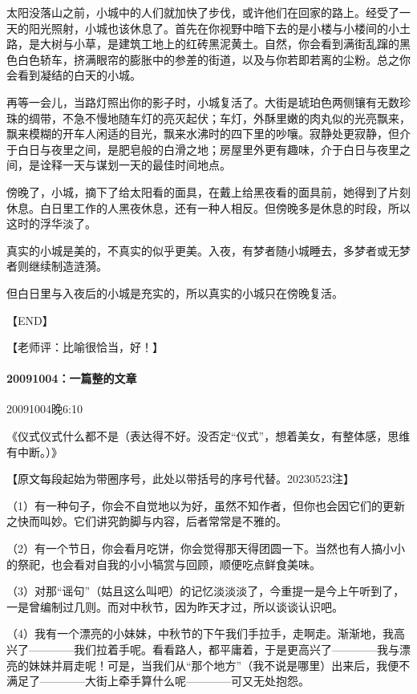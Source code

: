 \documentclass[UTF8]{Diaries}
\begin{document}
太阳没落山之前，小城中的人们就加快了步伐，或许他们在回家的路上。经受了一天的阳光照射，小城也该休息了。首先在你视野中暗下去的是小楼与小楼间的小土路，是大树与小草，是建筑工地上的红砖黑泥黄土。自然，你会看到满街乱蹿的黑色白色轿车，挤满眼帘的膨胀中的参差的街道，以及与你若即若离的尘粉。总之你会看到凝结的白天的小城。

再等一会儿，当路灯照出你的影子时，小城复活了。大街是琥珀色两侧镶有无数珍珠的绸带，不急不慢地随车灯的亮灭起伏；车灯，外酥里嫩的肉丸似的光亮飘来，飘来模糊的开车人闲适的目光，飘来水沸时的四下里的吵嚷。寂静处更寂静，但介于白日与夜里之间，是肥皂般的白滑之地；房屋里外更有趣味，介于白日与夜里之间，是诠释一天与谋划一天的最佳时间地点。

傍晚了，小城，摘下了给太阳看的面具，在戴上给黑夜看的面具前，她得到了片刻休息。白日里工作的人黑夜休息，还有一种人相反。但傍晚多是休息的时段，所以这时的浮华淡了。

真实的小城是美的，不真实的似乎更美。入夜，有梦者随小城睡去，多梦者或无梦者则继续制造涟漪。

但白日里与入夜后的小城是充实的，所以真实的小城只在傍晚复活。

【END】

【老师评：比喻很恰当，好！】


\paragraph{20091004：一篇整的文章}

20091004晚6:10

《仪式仪式什么都不是（表达得不好。没否定“仪式”，想着美女，有整体感，思维有中断。）》

【原文每段起始为带圈序号，此处以带括号的序号代替。20230523注】

（1）有一种句子，你会不自觉地以为好，虽然不知作者，但你也会因它们的更新之快而叫妙。它们讲究韵脚与内容，后者常常是不雅的。

（2）有一个节日，你会看月吃饼，你会觉得那天得团圆一下。当然也有人搞小小的祭祀，也会看对自我的小小犒赏与回顾，顺便吃点鲜食美味。

（3）对那“谣句”（姑且这么叫吧）的记忆淡淡淡了，今重提一是今上午听到了，一是曾编制过几则。而对中秋节，因为昨天才过，所以谈谈认识吧。

（4）我有一个漂亮的小妹妹，中秋节的下午我们手拉手，走啊走。渐渐地，我高兴了————我们拉着手呢。看看路人，都平庸着，于是更高兴了————我与漂亮的妹妹并肩走呢！可是，当我们从“那个地方”（我不说是哪里）出来后，我便不满足了————大街上牵手算什么呢————可又无处抱怨。
\end{document}
